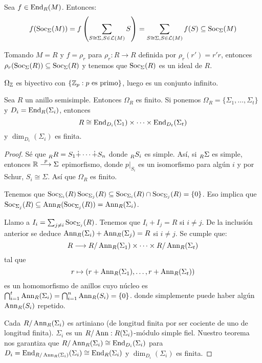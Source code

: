 \begin{obs}
  Sea \(f\in\operatorname{End}_R(M)\). Entonces:
  \[
    f(\operatorname{Soc}_\Sigma(M))=f\left(\sum_{S\cong\Sigma, S\in\mathcal{L}(M)} S\right)
    =\sum_{S\cong\Sigma, S\in\mathcal{L}(M)}f(S)\subseteq\operatorname{Soc}_\Sigma(M)
  \]

  Tomando \(M=R\) y \(f=\rho_r\) para \(\rho_r:R\longrightarrow R\) definida
  por \(\rho_r(r')=r'r\), entonces \(\rho_r(\operatorname{Soc}_\Sigma(R))\subseteq
  \operatorname{Soc}_\Sigma(R)\) y tenemos que \(\operatorname{Soc}_\Sigma(R)\) es un ideal de \(R\).
\end{obs}

\begin{obs}
  \(\Omega_{\mathbb{Z}}\) es biyectivo con
  \(\{\mathbb{Z}_p:p\textrm{ es primo}\}\), luego es un conjunto
  infinito.
\end{obs}

\begin{teo}
  Sea \(R\) un anillo semisimple. Entonces \(\Omega_R\) es finito.
  Si ponemos \(\Omega_R=\{\Sigma_1,\ldots,\Sigma_t\}\) y
  \(D_i=\operatorname{End}_R(\Sigma_i)\), entonces
  \[
    R\cong\operatorname{End}_{D_i}(\Sigma_1)\times \cdots\times\operatorname{End}_{D_t}(\Sigma_t)
  \]
  y \(\dim_{D_i}(\Sigma_i)\) es finita.
\end{teo}
\begin{proof}
  Sé que \(\prescript{}{R}{R}=S_1\dot{+}\cdots\dot{+} S_n\) donde
  \(\prescript{}{R}{S_i}\) es simple. Así, si
  \(\prescript{}{R}{\Sigma}\) es simple, entonces
  \(\mathbb{R}\overset{p}{\longrightarrow}\Sigma\) epimorfismo, donde
  \(p|_{S_i}\) es un isomorfismo para algún \(i\) y por Schur,
  \(S_i\cong\Sigma\).
  Así que \(\Omega_R\) es finito.

  Tenemos que \(\operatorname{Soc}_{\Sigma_i}(R)\operatorname{Soc}_{\Sigma_j}(R)\subseteq
  \operatorname{Soc}_{\Sigma_i}(R)\cap\operatorname{Soc}_{\Sigma_j}(R)=\{0\}\). Eso implica
  que
  \(\operatorname{Soc}_{\Sigma_j}(R)\subseteq\operatorname{Ann}_R(\operatorname{Soc}_{\Sigma_j}(R))=\operatorname{Ann}_R(\Sigma_i)\).

  Llamo a \(I_i=\sum_{j\neq i}\operatorname{Soc}_{\Sigma_j}(R)\). Tenemos que
  \(I_i+I_j=R\) si \(i\neq j\). De la inclusión anterior se deduce
  \(\operatorname{Ann}_R(\Sigma_i)+\operatorname{Ann}_R(\Sigma_j)=R\) si \(i\neq j\).
  Se cumple que:
  \[
    R\longrightarrow R/\operatorname{Ann}_R(\Sigma_1)\times\cdots
    \times R/\operatorname{Ann}_R(\Sigma_t)
  \]
  tal que
  \[
    r\mapsto (r+\operatorname{Ann}_R(\Sigma_1),\ldots,r+\operatorname{Ann}_R(\Sigma_t))
  \]
  es un homomorfismo de anillos cuyo núcleo es
  \(\bigcap_{i=1}^t \operatorname{Ann}_R(\Sigma_i)=\bigcap_{i=1}^n \operatorname{Ann}_R(S_i)=\{0\}\).
  donde simplemente puede haber algún \(\operatorname{Ann}_R(S_i)\) repetido.

  Cada \(R/\operatorname{Ann}_R(\Sigma_i)\) es artiniano (de longitud finita por ser
  cociente de uno de longitud finita). \(\Sigma_i\) es un
  \(R/\operatorname{Ann}:R(\Sigma_i)\)-módulo simple fiel. Nuestro teorema nos garantiza
  que \(R/\operatorname{Ann}_R(\Sigma_i)\cong\operatorname{End}_{D_i}(\Sigma_i)\) para
  \(D_i=\operatorname{End}_{R/\operatorname{Ann}_R(\Sigma_i)}(\Sigma_i)\cong\operatorname{End}_R(\Sigma_i)\) y
  \(\dim_{D_i}(\Sigma_i)\) es finita.

\end{proof}

